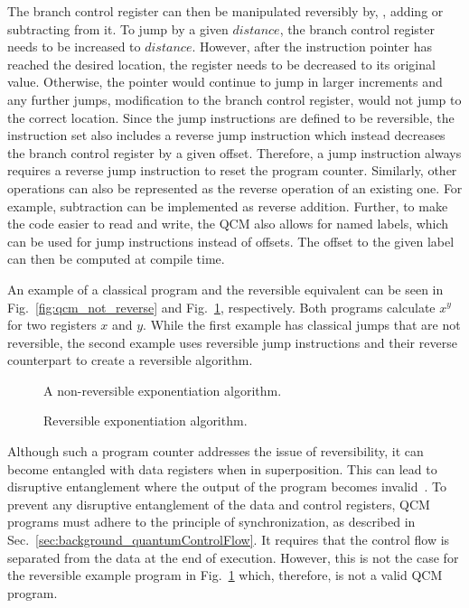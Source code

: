 The branch control register can then be manipulated reversibly by, \eg, adding or subtracting from it. To jump by a given $distance$, the branch control register needs to be increased to $distance$. However, after the instruction pointer has reached the desired location, the register needs to be decreased to its original value. Otherwise, the pointer would continue to jump in larger increments and any further jumps, \ie modification to the branch control register, would not jump to the correct location. Since the jump instructions are defined to be reversible, the instruction set also includes a reverse jump instruction which instead decreases the branch control register by a given offset. Therefore, a jump instruction always requires a reverse jump instruction to reset the program counter. Similarly, other operations can also be represented as the reverse operation of an existing one. For example, subtraction can be implemented as reverse addition. Further, to make the code easier to read and write, the QCM also allows for named labels, which can be used for jump instructions instead of offsets. The offset to the given label can then be computed at compile time. 

An example of a classical program and the reversible equivalent can be seen in Fig.~\ref{fig:qcm_not_reverse} and Fig.~\ref{fig:qcm_reverse}, respectively. Both programs calculate $x^y$ for two registers $x$ and $y$. While the first example has classical jumps that are not reversible, the second example uses reversible jump instructions and their reverse counterpart to create a reversible algorithm.

\begin{figure}[htp]
    \centering     
    \begin{minipage}{.40\textwidth}
        
        \caption{A non-reversible exponentiation algorithm.}
        \label{fig:qcm_not_reverse}
    \end{minipage}
    \hfill
    \begin{minipage}{.50\textwidth}
        
        \caption{Reversible exponentiation algorithm.}    
        \label{fig:qcm_reverse}
    \end{minipage}
\end{figure}

Although such a program counter addresses the issue of reversibility, it can become entangled with data registers when in superposition. This can lead to disruptive entanglement where the output of the program becomes invalid~\cite{YVC24}. To prevent any disruptive entanglement of the data and control registers, QCM programs must adhere to the principle of synchronization, as described in Sec.~\ref{sec:background_quantumControlFlow}. 
It requires that the control flow is separated from the data at the end of execution. However, this is not the case for the reversible example program in Fig.~\ref{fig:qcm_reverse} which, therefore, is not a valid QCM program.

